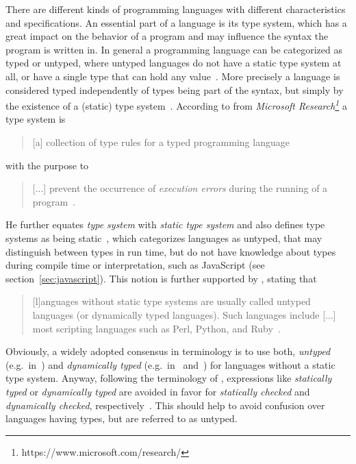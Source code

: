 There are different kinds of programming languages with different characteristics and specifications. An essential part of a language is its type system, which has a great impact on the behavior of a program and may influence the syntax the program is written in.
In general a programming language can be categorized as typed or untyped, where untyped languages do not have a static type system at all, or have a single type that can hold any value~\cite[p.~2]{TypeSystems:Cardelli:2004}. More precisely a language is considered typed independently of types being part of the syntax, but simply by the existence of a (static) type system~\cite[p.~2]{TypeSystems:Cardelli:2004}.
According to \citeauthor{TypeSystems:Cardelli:2004} from \emph{Microsoft Research\footnote{https://www.microsoft.com/research/}} a type system is
\begin{quote}
  [a] collection of type rules for a typed programming language~\cite[p.~38]{TypeSystems:Cardelli:2004}
\end{quote}
with the purpose to
\begin{quote}
  [...] prevent the occurrence of \emph{execution errors} during the running of a program~\cite[p.~1]{TypeSystems:Cardelli:2004}.
\end{quote}
He further equates \emph{type system} with \emph{static type system} and also \citeauthor{TypesAndProgrammingLanguages:Pierce:2002} defines type systems as being static~\cite[p.~2]{TypesAndProgrammingLanguages:Pierce:2002}, which categorizes languages as untyped, that may distinguish between types in run time, but do not have knowledge about types during compile time or interpretation, such as JavaScript (see section~\ref{sec:javascript}). This notion is further supported by \citeauthor{ProgrammingLanguagesPrinciplesAndPractices:LoudenLambert:2011}, stating that
\begin{quote}
  [l]anguages without static type systems are usually called untyped languages (or dynamically typed languages). Such languages include [...] most scripting languages such as Perl, Python, and Ruby~\cite[p.~331]{ProgrammingLanguagesPrinciplesAndPractices:LoudenLambert:2011}.
\end{quote}
Obviously, a widely adopted consensus in terminology is to use both, \emph{untyped} (e.g.\ in~\cite[p.~117]{LogicalTypesForUntypedLanguages:Tobin-Hochstadt:2010}) and \emph{dynamically typed} (e.g.\ in~\cite[p.~32]{TowardsAProgramLogicForJavaScript:Gardner:2012} and~\cite[p.~203]{TypeSystemsDirectedProgrammingLanguageEvolution:Nino:2012}) for languages without a static type system. Anyway, following the terminology of \citeauthor{TypeSystems:Cardelli:2004}, expressions like \emph{statically typed} or \emph{dynamically typed} are avoided in favor for \emph{statically checked} and \emph{dynamically checked}, respectively~\cite[p.~1]{TypeSystems:Cardelli:2004}. This should help to avoid confusion over languages having types, but are referred to as untyped.


